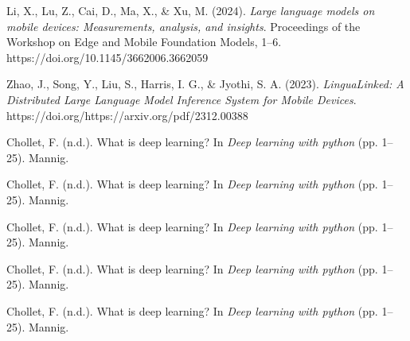 \documentclass[licencjacka,en]{pracamgr}
\begin{document}
\begin{thebibliography}{99}
Li, X., Lu, Z., Cai, D., Ma, X., \& Xu, M. (2024). \textit{Large language models on mobile devices: Measurements, analysis, and insights}. Proceedings of the Workshop on Edge and Mobile Foundation Models, 1–6. https://doi.org/10.1145/3662006.3662059

Zhao, J., Song, Y.,  Liu, S., Harris, I. G., \& Jyothi, S. A. (2023). \textit{LinguaLinked: A Distributed Large Language Model Inference System for Mobile Devices}. https://doi.org/https://arxiv.org/pdf/2312.00388


Chollet, F. (n.d.). What is deep learning? In \textit{Deep learning with python} (pp. 1–25). Mannig.

Chollet, F. (n.d.). What is deep learning? In \textit{Deep learning with python} (pp. 1–25). Mannig.

Chollet, F. (n.d.). What is deep learning? In \textit{Deep learning with python} (pp. 1–25). Mannig.

Chollet, F. (n.d.). What is deep learning? In \textit{Deep learning with python} (pp. 1–25). Mannig.

Chollet, F. (n.d.). What is deep learning? In \textit{Deep learning with python} (pp. 1–25). Mannig.


\end{thebibliography}
\end{document}
